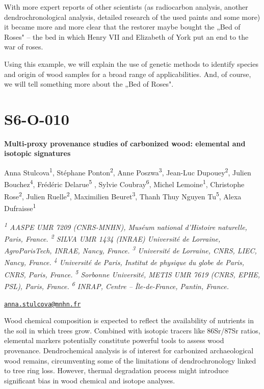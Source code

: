 \documentclass[
]{book}
\begin{document}
With more expert reports of other scientists (as radiocarbon analysis, another dendrochronological analysis, detailed research of the used paints and some more) it became more and more clear that the restorer maybe bought the „Bed of Roses" -- the bed in which Henry VII and Elizabeth of York put an end to the war of roses.

Using this example, we will explain the use of genetic methods to identify species and origin of wood samples for a broad range of applicabilities. And, of course, we will tell something more about the „Bed of Roses".

\hypertarget{s6-o-010}{%
\section*{S6-O-010}\label{s6-o-010}}

\textbf{Multi-proxy provenance studies of carbonized wood: elemental and isotopic signatures}

Anna Stulcova\textsuperscript{1}, Stéphane Ponton\textsuperscript{2}, Anne Poszwa\textsuperscript{3}, Jean-Luc Dupouey\textsuperscript{2}, Julien Bouchez\textsuperscript{4}, Frédéric Delarue\textsuperscript{5} , Sylvie Coubray\textsuperscript{6}, Michel Lemoine\textsuperscript{1}, Christophe Rose\textsuperscript{2}, Julien Ruelle\textsuperscript{2}, Maximilien Beuret\textsuperscript{3}, Thanh Thuy Nguyen Tu\textsuperscript{5}, Alexa Dufraisse\textsuperscript{1}

\emph{\textsuperscript{1} AASPE UMR 7209 (CNRS-MNHN), Muséum national d'Histoire naturelle, Paris, France. \textsuperscript{2} SILVA UMR 1434 (INRAE) Université de Lorraine, AgroParisTech, INRAE, Nancy, France. \textsuperscript{3} Université de Lorraine, CNRS, LIEC, Nancy, France. \textsuperscript{4} Université de Paris, Institut de physique du globe de Paris, CNRS, Paris, France. \textsuperscript{5} Sorbonne Université, METIS UMR 7619 (CNRS, EPHE, PSL), Paris, France. \textsuperscript{6} INRAP, Centre -- Île-de-France, Pantin, France.}

\href{mailto:anna.stulcova@mnhn.fr}{\nolinkurl{anna.stulcova@mnhn.fr}}

Wood chemical composition is expected to reflect the availability of nutrients in the soil in which trees grow. Combined with isotopic tracers like 86Sr/87Sr ratios, elemental markers potentially constitute powerful tools to assess wood provenance. Dendrochemical analysis is of interest for carbonized archaeological wood remains, circumventing some of the limitations of dendrochronology linked to tree ring loss. However, thermal degradation process might introduce significant bias in wood chemical and isotope analyses.
\end{document}
